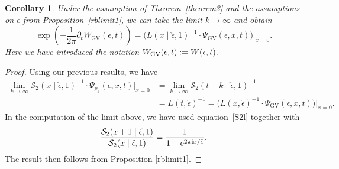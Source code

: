 \documentclass[pdftex]{sigma}
\numberwithin{equation}{section}
\newtheorem{Corollary}[Theorem]{Corollary}
\begin{document}
\begin{Corollary}\label{corthm3}
Under the assumption of Theorem~{\rm \ref{theorem3}} and the assumptions on $\epsilon$ from Proposition~{\rm \ref{rblimit1}}, we can take the limit $k \to \infty$ and obtain
\begin{equation*}%
 \exp\left(-\frac{1}{2\pi}\partial_tW_{\mathrm{GV}}(\epsilon,t)\right)=\big(L(x\mid \check\epsilon,1)^{-1}\cdot \Psi_{\mathrm{GV}}(\epsilon,x,t)\big)\big|_{x=0}.
\end{equation*}
Here we have introduced the notation $W_{{\rm GV}}(\epsilon,t):=W(\epsilon,t)$.
\end{Corollary}

\begin{proof}
Using our previous results, we have
\begin{align*}
 \lim_{k \to \infty} \mathcal{S}_2(x\mid \check{\epsilon},1)^{-1} \cdot \Psi_{\rho_k}(\epsilon,x,t)|_{x=0} &= \lim_{k \to \infty} \mathcal{S}_2(t+k\mid \check{\epsilon},1)^{-1} \\
 & = L(t,\check{\epsilon})^{-1} = \big(L(x,\check{\epsilon})^{-1}\cdot\Psi_{\mathrm{GV}}(\epsilon,x,t)\big)\big|_{x=0}.
 \end{align*}
In the computation of the limit above, we have used equation~\eqref{S2l} together with
\begin{equation*}
 \frac{\mathcal{S}_2(x+1\mid \check\epsilon,1)}{\mathcal{S}_2(x\mid \check\epsilon,1)}=\frac{1}{1-{\rm e}^{2\pi \mathrm{i} x/\check\epsilon}}.
\end{equation*}
The result then follows from Proposition \ref{rblimit1}.
\end{proof}
\end{document}
